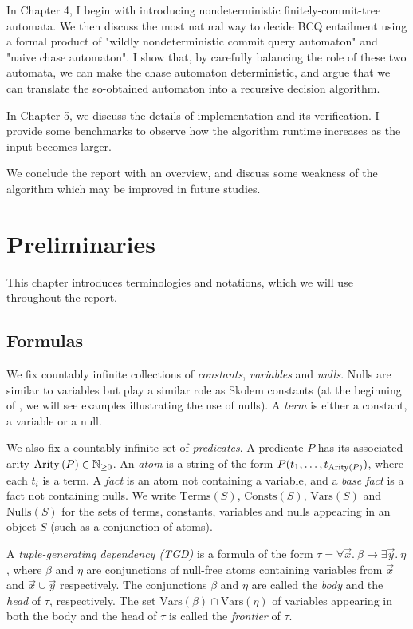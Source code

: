 \documentclass[12pt]{report}
\theoremstyle{plain}
\theoremstyle{definition}
\def\Vars{{\mathrm{Vars}}}
\def\Consts{{\mathrm{Consts}}}
\def\Terms{{\mathrm{Terms}}}
\def\Nulls{{\mathrm{Nulls}}}
\newcommand{\Arity}[1]{\ensuremath{\normalfont{\operatorname{Arity}} \left( #1 \right)}}
\begin{document}
In Chapter 4, I begin with introducing nondeterministic finitely-commit-tree automata. We then discuss the most natural way to decide BCQ entailment using a formal product of "wildly nondeterministic commit query automaton" and "naive chase automaton". I show that, by carefully balancing the role of these two automata, we can make the chase automaton deterministic, and argue that we can translate the so-obtained automaton into a recursive decision algorithm.

In Chapter 5, we discuss the details of implementation and its verification. I provide some benchmarks to observe how the algorithm runtime increases as the input becomes larger.

We conclude the report with an overview, and discuss some weakness of the algorithm which may be improved in future studies.

\newpage
\chapter{Preliminaries}

This chapter introduces terminologies and notations, which we will use throughout the report.

\section{Formulas}

We fix countably infinite collections of \emph{constants}, \emph{variables} and \emph{nulls}. Nulls are similar to variables but play a similar role as Skolem constants (at the beginning of , we will see examples illustrating the use of nulls). A \emph{term} is either a constant, a variable or a null.

We also fix a countably infinite set of \emph{predicates}. A predicate $P$ has its associated arity $\Arity{P} \in \mathbb{N}_{\geq 0}$. An \emph{atom} is a string of the form $P(t_1, \ldots, t_{\Arity{P}})$, where each $t_i$ is a term. A \emph{fact} is an atom not containing a variable, and a \emph{base fact} is a fact not containing nulls. We write $\Terms(S)$, $\Consts(S)$, $\Vars(S)$ and $\Nulls(S)$ for the sets of terms, constants, variables and nulls appearing in an object $S$ (such as a conjunction of atoms).

A \emph{tuple-generating dependency (TGD)} is a formula of the form $\tau = \forall \vec{x}.\ \beta \rightarrow \exists \vec{y}.\ \eta$, where $\beta$ and $\eta$ are conjunctions of null-free atoms containing variables from $\vec{x}$ and $\vec{x} \cup \vec{y}$ respectively. The conjunctions $\beta$ and $\eta$ are called the \emph{body} and the \emph{head} of $\tau$, respectively. The set $\Vars(\beta) \cap \Vars(\eta)$ of variables appearing in both the body and the head of $\tau$ is called the \emph{frontier} of $\tau$.
\end{document}
